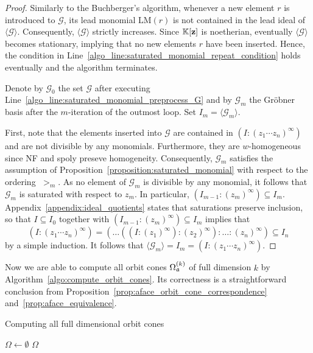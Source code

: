 \begin{proof}
	Similarly to the Buchberger's algorithm, whenever a new element $r$ is introduced to $\mathcal{G}$, its lead monomial $\text{LM}(r)$ is not contained in the lead ideal of $\langle \mathcal{G} \rangle$. Consequently, $\langle \mathcal{G} \rangle$ strictly increases. Since $\mathbb{K}[\mathbf{z}]$ is noetherian, eventually $\langle \mathcal{G} \rangle$ becomes stationary, implying that no new elements $r$ have been inserted. Hence, the condition in Line~\ref{algo_line:saturated_monomial_repeat_condition} holds eventually and the algorithm terminates.
	
	Denote by $\mathcal{G}_0$ the set $\mathcal{G}$ after executing Line~\ref{algo_line:saturated_monomial_preprocess_G} and by $\mathcal{G}_m$ the Gröbner basis after the $m$-iteration of the outmost loop. Set $I_m = \langle \mathcal{G}_m \rangle$.
	
	First, note that the elements inserted into $\mathcal{G}$ are contained in $(I:(z_1\cdots z_n)^\infty)$ and are not divisible by any monomials. Furthermore, they are $w$-homogeneous since NF and spoly preseve homogeneity. Consequently, $\mathcal{G}_m$ satisfies the assumption of Proposition~\ref{proposition:saturated_monomial} with respect to the ordering $\;>_m$. As no element of $\mathcal{G}_m$ is divisible by any monomial, it follows that $\mathcal{G}_m$ is saturated with respect to $z_m$. In particular, $(I_{m-1} : (z_m)^\infty) \subseteq I_m$. Appendix~\ref{appendix:ideal_quotients} states that saturations preserve inclusion, so that $I\subseteq I_0$ together with $(I_{m-1} : (z_m)^\infty) \subseteq I_m$ implies that
	$$(I:(z_1\cdots z_n)^\infty) = (\dots((I:(z_1)^\infty):(z_2)^\infty):\dots : (z_n)^\infty) \subseteq I_n$$
	by a simple induction. It follows that $\langle \mathcal{G}_m \rangle = I_m = (I:(z_1\cdots z_n)^\infty)$.
\end{proof}

Now we are able to compute all orbit cones $\Omega_{\mathfrak{a}}^{(k)}$ of full dimension $k$ by Algorithm~\ref{algo:compute_orbit_cones}. Its correctness is a straightforward conclusion from  Proposition~\ref{prop:aface_orbit_cone_correspondence} and~\ref{prop:aface_equivalence}.

\begin{algorithm}
	\caption{Computing all full dimensional orbit cones}
	\label{algo:compute_orbit_cones}
	
	\BlankLine
	$\Omega \leftarrow \emptyset$\;
	\Return $\Omega$\;
\end{algorithm}

